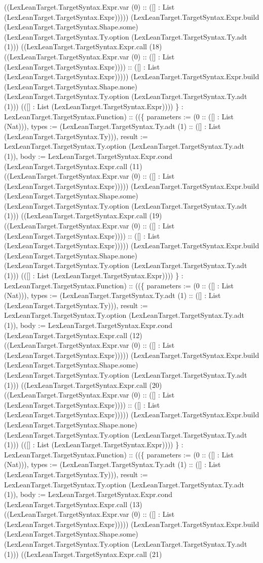 \documentclass[11pt]{article}
\begin{document}
((LexLeanTarget.TargetSyntax.Expr.var (0) :: ([] : List (LexLeanTarget.TargetSyntax.Expr))))) (LexLeanTarget.TargetSyntax.Expr.build (LexLeanTarget.TargetSyntax.Shape.some) (LexLeanTarget.TargetSyntax.Ty.option (LexLeanTarget.TargetSyntax.Ty.adt (1))) ((LexLeanTarget.TargetSyntax.Expr.call (18) ((LexLeanTarget.TargetSyntax.Expr.var (0) :: ([] : List (LexLeanTarget.TargetSyntax.Expr)))) :: ([] : List (LexLeanTarget.TargetSyntax.Expr))))) (LexLeanTarget.TargetSyntax.Expr.build (LexLeanTarget.TargetSyntax.Shape.none) (LexLeanTarget.TargetSyntax.Ty.option (LexLeanTarget.TargetSyntax.Ty.adt (1))) (([] : List (LexLeanTarget.TargetSyntax.Expr)))) \} : LexLeanTarget.TargetSyntax.Function) :: ((\{ parameters := (0 :: ([] : List (Nat))), types := (LexLeanTarget.TargetSyntax.Ty.adt (1) :: ([] : List (LexLeanTarget.TargetSyntax.Ty))), result := LexLeanTarget.TargetSyntax.Ty.option (LexLeanTarget.TargetSyntax.Ty.adt (1)), body := LexLeanTarget.TargetSyntax.Expr.cond (LexLeanTarget.TargetSyntax.Expr.call (11) ((LexLeanTarget.TargetSyntax.Expr.var (0) :: ([] : List (LexLeanTarget.TargetSyntax.Expr))))) (LexLeanTarget.TargetSyntax.Expr.build (LexLeanTarget.TargetSyntax.Shape.some) (LexLeanTarget.TargetSyntax.Ty.option (LexLeanTarget.TargetSyntax.Ty.adt (1))) ((LexLeanTarget.TargetSyntax.Expr.call (19) ((LexLeanTarget.TargetSyntax.Expr.var (0) :: ([] : List (LexLeanTarget.TargetSyntax.Expr)))) :: ([] : List (LexLeanTarget.TargetSyntax.Expr))))) (LexLeanTarget.TargetSyntax.Expr.build (LexLeanTarget.TargetSyntax.Shape.none) (LexLeanTarget.TargetSyntax.Ty.option (LexLeanTarget.TargetSyntax.Ty.adt (1))) (([] : List (LexLeanTarget.TargetSyntax.Expr)))) \} : LexLeanTarget.TargetSyntax.Function) :: ((\{ parameters := (0 :: ([] : List (Nat))), types := (LexLeanTarget.TargetSyntax.Ty.adt (1) :: ([] : List (LexLeanTarget.TargetSyntax.Ty))), result := LexLeanTarget.TargetSyntax.Ty.option (LexLeanTarget.TargetSyntax.Ty.adt (1)), body := LexLeanTarget.TargetSyntax.Expr.cond (LexLeanTarget.TargetSyntax.Expr.call (12) ((LexLeanTarget.TargetSyntax.Expr.var (0) :: ([] : List (LexLeanTarget.TargetSyntax.Expr))))) (LexLeanTarget.TargetSyntax.Expr.build (LexLeanTarget.TargetSyntax.Shape.some) (LexLeanTarget.TargetSyntax.Ty.option (LexLeanTarget.TargetSyntax.Ty.adt (1))) ((LexLeanTarget.TargetSyntax.Expr.call (20) ((LexLeanTarget.TargetSyntax.Expr.var (0) :: ([] : List (LexLeanTarget.TargetSyntax.Expr)))) :: ([] : List (LexLeanTarget.TargetSyntax.Expr))))) (LexLeanTarget.TargetSyntax.Expr.build (LexLeanTarget.TargetSyntax.Shape.none) (LexLeanTarget.TargetSyntax.Ty.option (LexLeanTarget.TargetSyntax.Ty.adt (1))) (([] : List (LexLeanTarget.TargetSyntax.Expr)))) \} : LexLeanTarget.TargetSyntax.Function) :: ((\{ parameters := (0 :: ([] : List (Nat))), types := (LexLeanTarget.TargetSyntax.Ty.adt (1) :: ([] : List (LexLeanTarget.TargetSyntax.Ty))), result := LexLeanTarget.TargetSyntax.Ty.option (LexLeanTarget.TargetSyntax.Ty.adt (1)), body := LexLeanTarget.TargetSyntax.Expr.cond (LexLeanTarget.TargetSyntax.Expr.call (13) ((LexLeanTarget.TargetSyntax.Expr.var (0) :: ([] : List (LexLeanTarget.TargetSyntax.Expr))))) (LexLeanTarget.TargetSyntax.Expr.build (LexLeanTarget.TargetSyntax.Shape.some) (LexLeanTarget.TargetSyntax.Ty.option (LexLeanTarget.TargetSyntax.Ty.adt (1))) ((LexLeanTarget.TargetSyntax.Expr.call (21) 
\end{document}
